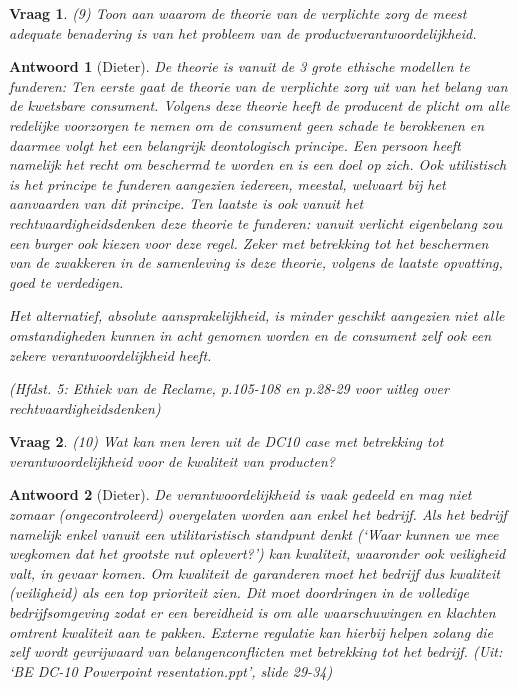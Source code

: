 \documentclass{article}
\theoremstyle{nonumberplain}
\newtheorem{question}{Vraag}
\newtheorem{answer}{Antwoord}
\begin{document}
\begin{question}
(9)	Toon aan waarom de theorie van de verplichte zorg de meest adequate benadering is van het probleem van de productverantwoordelijkheid.
\end{question}
\begin{answer}[Dieter]
	De theorie is vanuit de 3 grote ethische modellen te funderen:
	Ten eerste gaat de theorie van de verplichte zorg uit van het belang van de kwetsbare consument. 
	Volgens deze theorie heeft de producent de plicht om alle redelijke voorzorgen te nemen om de consument geen schade te berokkenen en daarmee volgt het een belangrijk deontologisch principe.
	Een persoon heeft namelijk het recht om beschermd te worden en is een doel op zich.
	Ook utilistisch is het principe te funderen aangezien iedereen, meestal, welvaart bij het aanvaarden van dit principe.
	Ten laatste is ook vanuit het rechtvaardigheidsdenken deze theorie te funderen: vanuit verlicht eigenbelang zou een burger ook kiezen voor deze regel.
	Zeker met betrekking tot het beschermen van de zwakkeren in de samenleving is deze theorie, volgens de laatste opvatting, goed te verdedigen.

	Het alternatief, absolute aansprakelijkheid, is minder geschikt aangezien niet alle omstandigheden kunnen in acht genomen worden en de consument zelf ook een zekere verantwoordelijkheid heeft.

	\textit{(Hfdst. 5: Ethiek van de Reclame, p.105-108 en p.28-29 voor uitleg over rechtvaardigheidsdenken)}
\end{answer}

\begin{question}
(10)	Wat kan men leren uit de DC10 case met betrekking tot verantwoordelijkheid voor de kwaliteit van producten? 
\end{question}
\begin{answer}[Dieter]
	De verantwoordelijkheid is vaak gedeeld en mag niet zomaar (ongecontroleerd) overgelaten worden aan enkel het bedrijf.
	Als het bedrijf namelijk enkel vanuit een utilitaristisch standpunt denkt (`Waar kunnen we mee wegkomen dat het grootste nut oplevert?') kan kwaliteit, waaronder ook veiligheid valt, in gevaar komen.
	Om kwaliteit de garanderen moet het bedrijf dus kwaliteit (veiligheid)  als een top prioriteit zien.
	Dit moet doordringen in de volledige bedrijfsomgeving zodat er een bereidheid is om alle waarschuwingen en klachten omtrent kwaliteit aan te pakken.
	Externe regulatie kan hierbij helpen zolang die zelf wordt gevrijwaard van belangenconflicten met betrekking tot het bedrijf.
	\textit{(Uit: `BE DC-10 Powerpoint resentation.ppt', slide 29-34)}
\end{answer}
\end{document}

